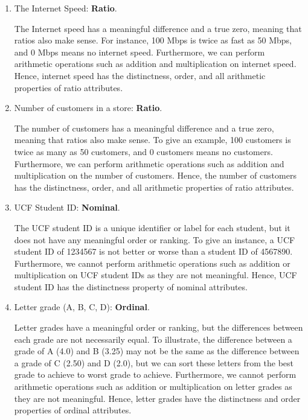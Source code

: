\documentclass[12pt,letterpaper, onecolumn]{exam}
\begin{document}
\begin{questions}
\begin{solution}
\begin{enumerate}[label=(\alph*)]
            \item The Internet Speed: \textbf{Ratio}. 
            
            The Internet speed has a meaningful difference and a true zero, meaning that ratios also make sense. 
            For instance, 100 Mbps is twice as fast as 50 Mbps, and 0 Mbps means no internet speed.
            Furthermore, we can perform arithmetic operations such as addition and multiplication on internet speed.
            Hence, internet speed has the distinctness, order, and all arithmetic properties of ratio attributes.

            \item Number of customers in a store: \textbf{Ratio}.
            
            The number of customers has a meaningful difference and a true zero, meaning that ratios also make sense.
            To give an example, 100 customers is twice as many as 50 customers, and 0 customers means no customers.
            Furthermore, we can perform arithmetic operations such as addition and multiplication on the number of customers.
            Hence, the number of customers has the distinctness, order, and all arithmetic properties of ratio attributes.

            \item UCF Student ID: \textbf{Nominal}. 
            
            The UCF student ID is a unique identifier or label for each student, but it does not have any meaningful order or ranking.
            To give an instance, a UCF student ID of 1234567 is not better or worse than a student ID of 4567890.
            Furthermore, we cannot perform arithmetic operations such as addition or multiplication on UCF student IDs as they are not meaningful.
            Hence, UCF student ID has the distinctness property of nominal attributes.

            \item Letter grade (A, B, C, D): \textbf{Ordinal}.
            
            Letter grades have a meaningful order or ranking, but the differences between each grade are not necessarily equal.
            To illustrate, the difference between a grade of A (4.0) and B (3.25) may not be the same as the difference between a grade of C (2.50) and D (2.0), but we can
            sort these letters from the best grade to achieve to worst grade to achieve.
            Furthermore, we cannot perform arithmetic operations such as addition or multiplication on letter grades as they are not meaningful.
            Hence, letter grades have the distinctness and order properties of ordinal attributes.
        \end{enumerate}
    \end{solution}


\end{questions}
\end{document}

